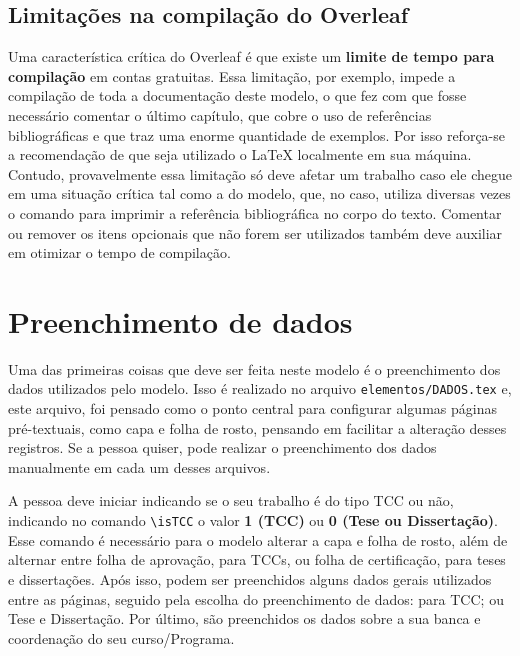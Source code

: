 \subsection{Limitações na compilação do Overleaf}
    Uma característica crítica do Overleaf é que existe um \textbf{limite de tempo para compilação} em contas gratuitas. Essa limitação, por exemplo, impede a compilação de toda a documentação deste modelo, o que fez com que fosse necessário comentar o último capítulo, que cobre o uso de referências bibliográficas e que traz uma enorme quantidade de exemplos. Por isso reforça-se a recomendação de que seja utilizado o \LaTeX{} localmente em sua máquina. Contudo, provavelmente essa limitação só deve afetar um trabalho caso ele chegue em uma situação crítica tal como a do modelo, que, no caso, utiliza diversas vezes o comando para imprimir a referência bibliográfica no corpo do texto. Comentar ou remover os itens opcionais que não forem ser utilizados também deve auxiliar em otimizar o tempo de compilação.

\section{Preenchimento de dados}
Uma das primeiras coisas que deve ser feita neste modelo é o preenchimento dos dados utilizados pelo modelo. Isso é realizado no arquivo \texttt{elementos/DADOS.tex} e, este arquivo, foi pensado como o ponto central para configurar algumas páginas pré-textuais, como capa e folha de rosto, pensando em facilitar a alteração desses registros. Se a pessoa quiser, pode realizar o preenchimento dos dados manualmente em cada um desses arquivos.

A pessoa deve iniciar indicando se o seu trabalho é do tipo TCC ou não, indicando no comando \verb|\isTCC| o valor \textbf{1 (TCC)} ou \textbf{0 (Tese ou Dissertação)}. Esse comando é necessário para o modelo alterar a capa e folha de rosto, além de alternar entre folha de aprovação, para TCCs, ou folha de certificação, para teses e dissertações. Após isso, podem ser preenchidos alguns dados gerais utilizados entre as páginas, seguido pela escolha do preenchimento de dados: para TCC; ou Tese e Dissertação. Por último, são preenchidos os dados sobre a sua banca e coordenação do seu curso/Programa.

